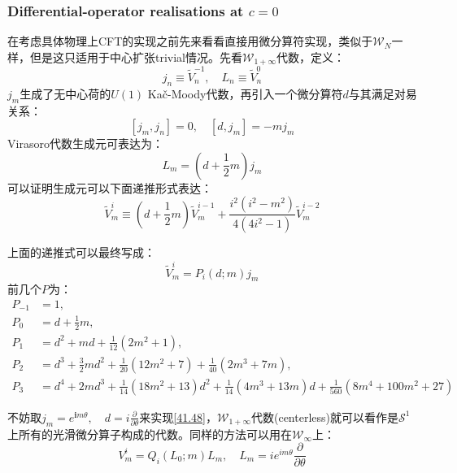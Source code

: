 \subsubsection{Differential-operator realisations at $c = 0$}
在考虑具体物理上CFT的实现之前先来看看直接用微分算符实现，类似于$\mathcal{W}_N$一样，但是这只适用于中心扩张trivial情况。先看$\mathcal{W}_{1+\infty}$代数，定义：
\begin{equation}
	j_n\equiv\widetilde{V}_n^{-1},\quad L_n\equiv\widetilde{V}_n^0
\end{equation}
$j_m$生成了无中心荷的$U(1)$ Ka\v{c}\mbox{-}Moody代数，再引入一个微分算符$d$与其满足对易关系：
\begin{equation}\label{41.48}
	[j_m,j_n]=0,\quad[d,j_m]=-mj_m
\end{equation}
Virasoro代数生成元可表达为：
\begin{equation}
	L_m=(d+\frac12m)j_m
\end{equation}
可以证明生成元可以下面递推形式表达：
\begin{equation}\label{41.50}
	\widetilde{V}_m^i\equiv(d+\frac12m)\widetilde{V}^{i-1}_m+\frac{i^2(i^2-m^2)}{4(4i^2-1)}\widetilde{V}_m^{i-2}
\end{equation}
\begin{example}
	上面的递推式可以最终写成：
	\begin{equation}
		\widetilde{V}_m^i=P_i(d;m)j_m
	\end{equation}
	前几个$P$为：
	\begin{equation}
		\begin{aligned}
			P_{-1}& =1,  \\
			P_{0}& =d+\frac12m,  \\
			P_{1}& =d^2+md+\frac1{12}(2m^2+1),  \\
			P_{2}& =d^3+\frac32md^2+\frac1{20}(12m^2+7)+\frac1{40}(2m^3+7m),  \\
			P_{3}& =d^4+2md^3+\frac{1}{14}(18m^2+13)d^2+\frac{1}{14}(4m^3+13m)d+\frac{1}{560}(8m^4+100m^2+27)
		\end{aligned}
	\end{equation}
\end{example}
不妨取$j_m=e^{\boldsymbol{i}m\theta},\quad d=i\frac\partial{\partial\theta}$来实现\ref{41.48}，$\mathcal{W}_{1+\infty}$代数(centerless)就可以看作是$\mathcal{S}^{1}$上所有的光滑微分算子构成的代数。同样的方法可以用在$\mathcal{W}_\infty$上：
\begin{equation}
	V_m^i=Q_i(L_0;m)L_m,\quad L_m=ie^{im\theta}\frac\partial{\partial\theta}
\end{equation}
